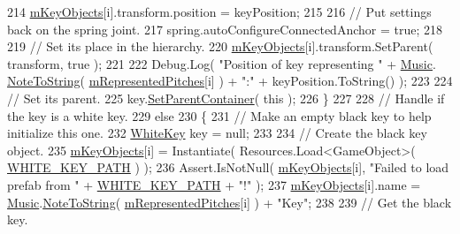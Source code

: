 \begin{DoxyCode}
214                 \hyperlink{group___key_contain_priv_var_ga01addf187bb12ffe824374df98e2c2d8}{mKeyObjects}[i].transform.position = keyPosition;
215 
216                 \textcolor{comment}{// Put settings back on the spring joint.}
217                 spring.autoConfigureConnectedAnchor = \textcolor{keyword}{true};
218 
219                 \textcolor{comment}{// Set its place in the hierarchy.}
220                 \hyperlink{group___key_contain_priv_var_ga01addf187bb12ffe824374df98e2c2d8}{mKeyObjects}[i].transform.SetParent( transform, \textcolor{keyword}{true} );
221 
222                 Debug.Log( \textcolor{stringliteral}{"Position of key representing "} + \hyperlink{class_music}{Music}.
      \hyperlink{group___music_stat_func_ga85a22c905d56d4c5f4e62159bfecee8c}{NoteToString}( \hyperlink{group___key_contain_priv_var_ga103945a6efe3469191e5253d13fec5be}{mRepresentedPitches}[i] ) + \textcolor{stringliteral}{":"} + keyPosition.ToString() );
223 
224                 \textcolor{comment}{// Set its parent.}
225                 key.\hyperlink{group___black_key_pub_func_ga49d807a46e36ba19211be329db1cbd2e}{SetParentContainer}( \textcolor{keyword}{this} );
226             \}
227 
228             \textcolor{comment}{// Handle if the key is a white key.}
229             \textcolor{keywordflow}{else}
230             \{
231                 \textcolor{comment}{// Make an empty black key to help initialize this one.}
232                 \hyperlink{class_white_key}{WhiteKey} key = null;
233 
234                 \textcolor{comment}{// Create the black key object.}
235                 \hyperlink{group___key_contain_priv_var_ga01addf187bb12ffe824374df98e2c2d8}{mKeyObjects}[i] = Instantiate( Resources.Load<GameObject>( 
      \hyperlink{group___key_contain_const_ga8ce7e53d5c067095ee26b96fcc522584}{WHITE\_KEY\_PATH} ) );
236                 Assert.IsNotNull( \hyperlink{group___key_contain_priv_var_ga01addf187bb12ffe824374df98e2c2d8}{mKeyObjects}[i], \textcolor{stringliteral}{"Failed to load prefab from "} + 
      \hyperlink{group___key_contain_const_ga8ce7e53d5c067095ee26b96fcc522584}{WHITE\_KEY\_PATH} + \textcolor{stringliteral}{"!"} );
237                 \hyperlink{group___key_contain_priv_var_ga01addf187bb12ffe824374df98e2c2d8}{mKeyObjects}[i].name = \hyperlink{class_music}{Music}.\hyperlink{group___music_stat_func_ga85a22c905d56d4c5f4e62159bfecee8c}{NoteToString}( 
      \hyperlink{group___key_contain_priv_var_ga103945a6efe3469191e5253d13fec5be}{mRepresentedPitches}[i] ) + \textcolor{stringliteral}{"Key"};
238 
239                 \textcolor{comment}{// Get the black key.}

\end{DoxyCode}
